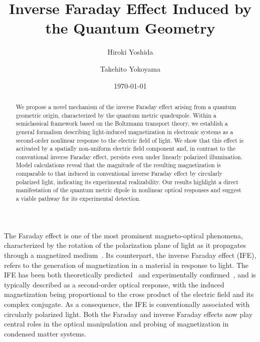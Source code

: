 \documentclass[aps,prb,longbibliography,superscriptaddress,twocolumn]{revtex4-2}
\begin{document}
\title{Inverse Faraday Effect Induced by the Quantum Geometry}

\author{Hiroki Yoshida}
\author{Takehito Yokoyama}


\date{\today}


\begin{abstract}
    We propose a novel mechanism of the inverse Faraday effect arising from a quantum geometric origin, characterized by the quantum metric quadrupole. Within a semiclassical framework based on the Boltzmann transport theory, we establish a general formalism describing light-induced magnetization in electronic systems as a second-order nonlinear response to the electric field of light. We show that this effect is activated by a spatially non-uniform electric field component and, in contrast to the conventional inverse Faraday effect, persists even under linearly polarized illumination. Model calculations reveal that the magnitude of the resulting magnetization is comparable to that induced in conventional inverse Faraday effect by circularly polarized light, indicating its experimental realizability. Our results highlight a direct manifestation of the quantum metric dipole in nonlinear optical responses and suggest a viable pathway for its experimental detection.
\end{abstract}

\maketitle

The Faraday effect is one of the most prominent magneto-optical phenomena, characterized by the rotation of the polarization plane of light as it propagates through a magnetized medium~\cite{Faraday_1846}. Its counterpart, the inverse Faraday effect (IFE), refers to the generation of magnetization in a material in response to light. The IFE has been both theoretically predicted~\cite{Pitaevskii_1961,Pershan_1963} and experimentally confirmed~\cite{Zeil_Optically_1965}, and is typically described as a second-order optical response, with the induced magnetization being proportional to the cross product of the electric field and its complex conjugate. As a consequence, the IFE is conventionally associated with circularly polarized light. Both the Faraday and inverse Faraday effects now play central roles in the optical manipulation and probing of magnetization in condensed matter systems.
\end{document}
